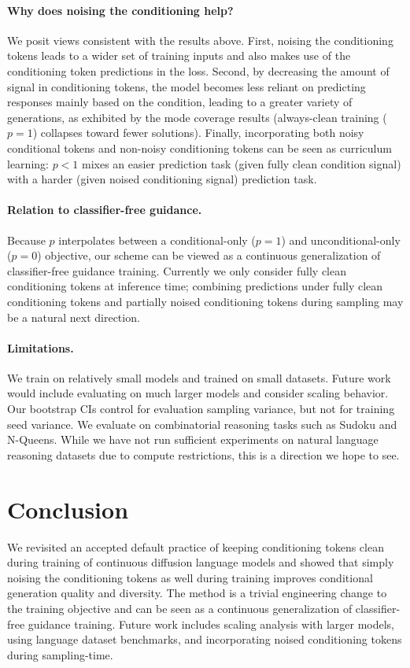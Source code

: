 \documentclass{article}
\begin{document}
\paragraph{Why does noising the conditioning help?}
We posit views consistent with the results above. First, noising the conditioning tokens 
leads to a wider set of training inputs and also makes use of the conditioning token predictions 
in the loss. Second, by decreasing the amount of signal in conditioning tokens, the model becomes
less reliant on predicting responses mainly based on the condition, leading to a greater 
variety of generations, as exhibited by the mode coverage results (always-clean training ($p=1$) collapses toward fewer solutions).
Finally, incorporating both noisy conditional tokens and non-noisy conditioning tokens can be 
seen as curriculum learning: $p<1$ mixes an easier prediction task (given fully clean condition signal)
with a harder (given noised conditioning signal) prediction task. 

\paragraph{Relation to classifier-free guidance.}
Because $p$ interpolates between a conditional-only ($p=1$) and unconditional-only ($p=0$) objective,
our scheme can be viewed as a continuous generalization of classifier-free guidance training. 
Currently we only consider fully clean conditioning tokens at inference time; 
combining predictions under fully clean conditioning tokens and partially noised conditioning 
tokens during sampling may be a natural next direction. 

\paragraph{Limitations.}
We train on relatively small models and trained on small datasets. Future work
would include evaluating on much larger models and consider scaling behavior.
Our bootstrap CIs control for evaluation sampling variance, but not for
training seed variance. We evaluate on combinatorial reasoning tasks such as Sudoku and N-Queens. 
While we have not run sufficient experiments on natural language reasoning datasets due to compute
restrictions, this is a direction we hope to see.   

\section{Conclusion}
\label{sec:conclusion}
We revisited an accepted default practice of keeping conditioning tokens clean during training
of continuous diffusion language models and showed that simply noising the conditioning tokens
as well during training improves conditional generation quality and diversity. The method is a trivial engineering change to the training objective and
can be seen as a continuous generalization of classifier-free guidance training. 
Future work includes scaling analysis with larger models, using language dataset benchmarks,
and incorporating noised conditioning tokens during sampling-time. 
\end{document}
